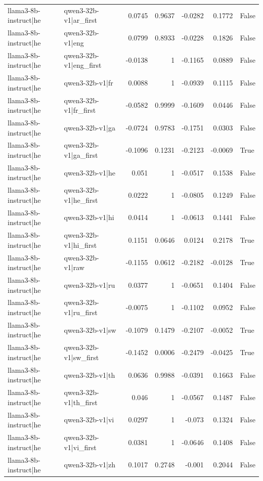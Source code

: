 \begin{table}
\begin{tabular}{l l r r r r l}
llama3-8b-instruct|he & qwen3-32b-v1|ar_first & 0.0745 & 0.9637 & -0.0282 & 0.1772 & False \\
llama3-8b-instruct|he & qwen3-32b-v1|eng & 0.0799 & 0.8933 & -0.0228 & 0.1826 & False \\
llama3-8b-instruct|he & qwen3-32b-v1|eng_first & -0.0138 & 1 & -0.1165 & 0.0889 & False \\
llama3-8b-instruct|he & qwen3-32b-v1|fr & 0.0088 & 1 & -0.0939 & 0.1115 & False \\
llama3-8b-instruct|he & qwen3-32b-v1|fr_first & -0.0582 & 0.9999 & -0.1609 & 0.0446 & False \\
llama3-8b-instruct|he & qwen3-32b-v1|ga & -0.0724 & 0.9783 & -0.1751 & 0.0303 & False \\
llama3-8b-instruct|he & qwen3-32b-v1|ga_first & -0.1096 & 0.1231 & -0.2123 & -0.0069 & True \\
llama3-8b-instruct|he & qwen3-32b-v1|he & 0.051 & 1 & -0.0517 & 0.1538 & False \\
llama3-8b-instruct|he & qwen3-32b-v1|he_first & 0.0222 & 1 & -0.0805 & 0.1249 & False \\
llama3-8b-instruct|he & qwen3-32b-v1|hi & 0.0414 & 1 & -0.0613 & 0.1441 & False \\
llama3-8b-instruct|he & qwen3-32b-v1|hi_first & 0.1151 & 0.0646 & 0.0124 & 0.2178 & True \\
llama3-8b-instruct|he & qwen3-32b-v1|raw & -0.1155 & 0.0612 & -0.2182 & -0.0128 & True \\
llama3-8b-instruct|he & qwen3-32b-v1|ru & 0.0377 & 1 & -0.0651 & 0.1404 & False \\
llama3-8b-instruct|he & qwen3-32b-v1|ru_first & -0.0075 & 1 & -0.1102 & 0.0952 & False \\
llama3-8b-instruct|he & qwen3-32b-v1|sw & -0.1079 & 0.1479 & -0.2107 & -0.0052 & True \\
llama3-8b-instruct|he & qwen3-32b-v1|sw_first & -0.1452 & 0.0006 & -0.2479 & -0.0425 & True \\
llama3-8b-instruct|he & qwen3-32b-v1|th & 0.0636 & 0.9988 & -0.0391 & 0.1663 & False \\
llama3-8b-instruct|he & qwen3-32b-v1|th_first & 0.046 & 1 & -0.0567 & 0.1487 & False \\
llama3-8b-instruct|he & qwen3-32b-v1|vi & 0.0297 & 1 & -0.073 & 0.1324 & False \\
llama3-8b-instruct|he & qwen3-32b-v1|vi_first & 0.0381 & 1 & -0.0646 & 0.1408 & False \\
llama3-8b-instruct|he & qwen3-32b-v1|zh & 0.1017 & 0.2748 & -0.001 & 0.2044 & False \\

\end{tabular}
\end{table}
